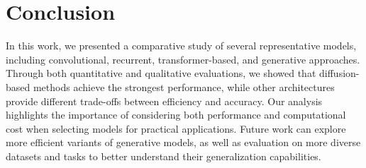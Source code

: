 \section{Conclusion}

In this work, we presented a comparative study of several representative models, 
including convolutional, recurrent, transformer-based, and generative approaches. 
Through both quantitative and qualitative evaluations, we showed that diffusion-based 
methods achieve the strongest performance, while other architectures provide 
different trade-offs between efficiency and accuracy.
%
Our analysis highlights the importance of considering both performance and 
computational cost when selecting models for practical applications. Future work 
can explore more efficient variants of generative models, as well as evaluation 
on more diverse datasets and tasks to better understand their generalization 
capabilities.
